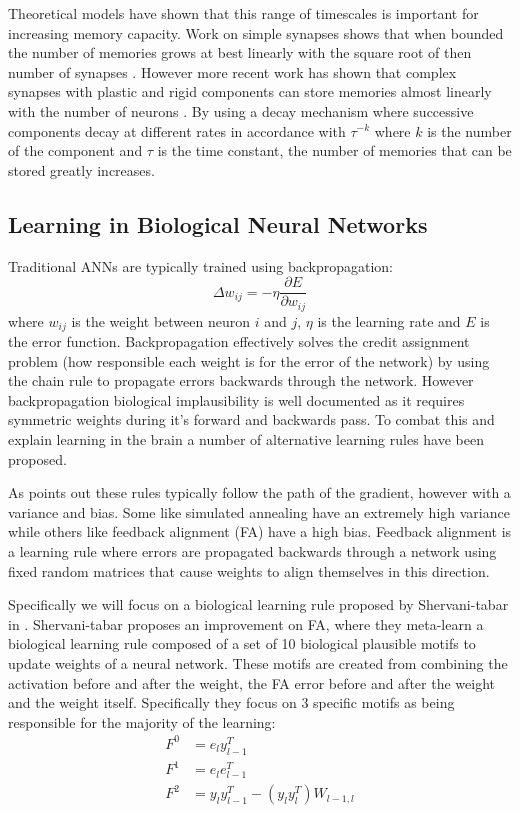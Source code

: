 \documentclass[a4paper, 11pt, oneside]{report}
\begin{document}
Theoretical models have shown that this range of timescales is important for increasing memory
capacity. Work on simple synapses shows that when bounded the number of memories
grows at best linearly with the square root of then number of synapses \cite{fusi2007}.
However more recent work has shown that complex synapses with plastic and 
rigid components can store memories almost linearly with the number of neurons \cite{benna2016}.
By using a decay mechanism where successive components decay at different rates
in accordance with $\tau^{-k}$ where $k$ is the number of the component and $\tau$ is the time constant, 
the number of memories that can be stored greatly increases.

\subsection*{Learning in Biological Neural Networks}

Traditional ANNs are typically trained using backpropagation:
\begin{equation}
    \Delta w_{ij} = -\eta \frac{\partial E}{\partial w_{ij}}
\end{equation}
where $w_{ij}$ is the weight between neuron $i$ and $j$, $\eta$ is the learning rate and $E$ is the error function.
Backpropagation effectively solves the credit assignment problem (how responsible each weight is 
for the error of the network) by using the chain rule to propagate
errors backwards through the network.
However backpropagation biological implausibility is well documented \cite{lv2024} as it 
requires symmetric weights during it's forward and backwards pass. 
To combat this and explain learning in the brain a number of alternative learning rules have been proposed.

As \cite{richards2019} points out these rules typically follow the path of the gradient, however with a variance and bias.
Some like simulated annealing \cite{szu1987} have an extremely high variance
while others like feedback alignment (FA) \cite{lillicrap2016a} have a high bias. Feedback
alignment is a learning rule where errors are propagated backwards through a network
using fixed random matrices that cause weights to align themselves in this direction.

Specifically we will focus on a biological learning rule proposed by Shervani-tabar in \cite{shervani-tabar2023}.
Shervani-tabar proposes an improvement on FA, where they meta-learn a biological learning rule composed of a set of 10 biological
plausible motifs to update weights of a neural network. These motifs are 
created from combining the activation before and after the weight, the FA error 
before and after the weight and the weight itself. Specifically they focus on 3 specific
motifs as being responsible for the majority of the learning:
\begin{align}
    F^0 &= e_{l}y^T_{l-1} \label{eq2} \\
    F^1 &= e_{l}e^T_{l-1} \label{eq3} \\
    F^2 &= y_{l}y^T_{l-1} - (y_{l}y^T_{l})W_{l-1,l} \label{eq4}
\end{align}
\end{document}
